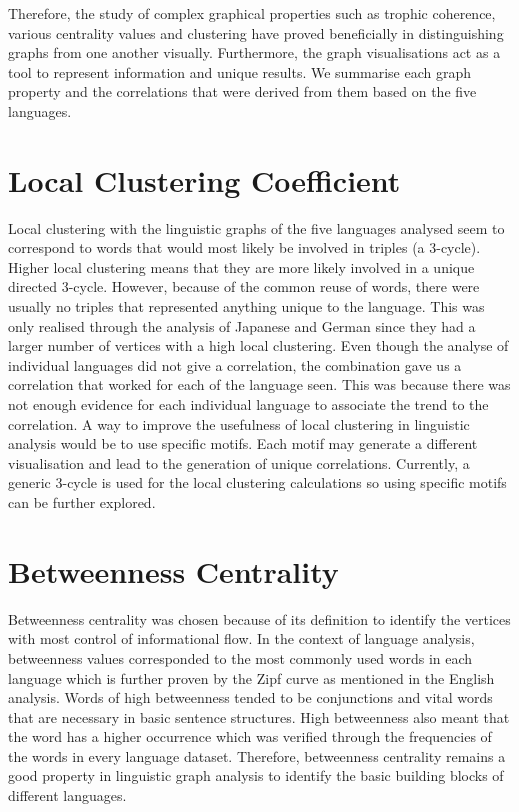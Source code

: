 Therefore, the study of complex graphical properties such as trophic coherence, various centrality values and clustering have proved beneficially in distinguishing graphs from one another visually. Furthermore, the graph visualisations act as a tool to represent information and unique results. We summarise each graph property and the correlations that were derived from them based on the five languages.

\section{Local Clustering Coefficient}
Local clustering with the linguistic graphs of the five languages analysed seem to correspond to words that would most likely be involved in triples (a 3-cycle). Higher local clustering means that they are more likely involved in a unique directed 3-cycle. However, because of the common reuse of words, there were usually no triples that represented anything unique to the language. This was only realised through the analysis of Japanese and German since they had a larger number of vertices with a high local clustering. Even though the analyse of individual languages did not give a correlation, the combination gave us a correlation that worked for each of the language seen. This was because there was not enough evidence for each individual language to associate the trend to the correlation. A way to improve the usefulness of local clustering in linguistic analysis would be to use specific motifs. Each motif may generate a different visualisation and lead to the generation of unique correlations. Currently, a generic 3-cycle is used for the local clustering calculations so using specific motifs can be further explored.

\section{Betweenness Centrality}
Betweenness centrality was chosen because of its definition to identify the vertices with most control of informational flow. In the context of language analysis, betweenness values corresponded to the most commonly used words in each language which is further proven by the Zipf curve as mentioned in the English analysis. Words of high betweenness tended to be conjunctions and vital words that are necessary in basic sentence structures. High betweenness also meant that the word has a higher occurrence which was verified through the frequencies of the words in every language dataset. Therefore, betweenness centrality remains a good property in linguistic graph analysis to identify the basic building blocks of different languages.

